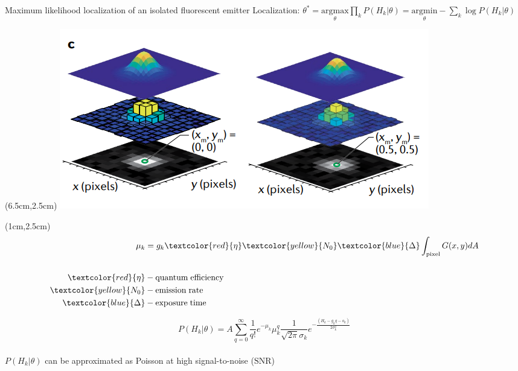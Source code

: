 \documentclass{beamer}					%
\begin{document}
\begin{frame}{Maximum likelihood localization of an isolated fluorescent emitter}
Localization: $\theta^{*} = \underset{\theta}{\mathrm{argmax}}\prod_{k}P(H_{k}|\theta)= \underset{\theta}{\mathrm{argmin}}-\sum_{k}\log P(H_{k}|\theta)$

\begin{textblock*}{8cm}(6.5cm,2.5cm)
\includegraphics[width=\textwidth]{Model.png}
\end{textblock*}

\begin{textblock*}{2cm}(1cm,2.5cm)
\begin{align*}
\mu_{k} &= g_{k}\textcolor{red}{\eta} \textcolor{yellow}{N_{0}}\textcolor{blue}{\Delta}\int_{\mathrm{pixel}} G(x,y)dA\\
\\
\textcolor{red}{\eta} &- \mathrm{quantum\; efficiency}\\
\textcolor{yellow}{N_{0}} &- \mathrm{emission\; rate}\\
\textcolor{blue}{\Delta} &- \mathrm{exposure\; time}
\end{align*}
\end{textblock*}


\vspace{2in}

\begin{equation*}
P(H_{k}|\theta) = A\sum_{q=0}^{\infty} \frac{1}{q!}e^{-\mu_{k}}\mu_{k}^{q}\frac{1}{\sqrt{2\pi}\sigma_{k}}e^{-\frac{(H_{k}-g_{k}q-o_{k})}{2\sigma_{k}^{2}}}
\end{equation*}
\\
$P(H_{k}|\theta)$ can be approximated as Poisson at high signal-to-noise ($\mathrm{SNR}$)

\end{frame}
\end{document}
